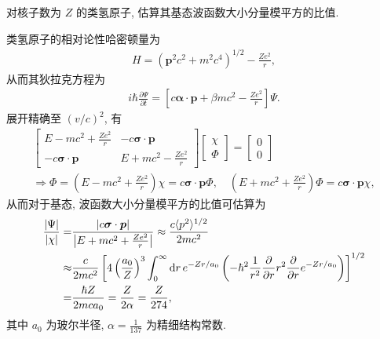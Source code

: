 \documentclass{assignment}
\begin{document}
\begin{prob}
    对核子数为 $Z$ 的类氢原子, 估算其基态波函数大小分量模平方的比值.
\end{prob}
\begin{sol}
    类氢原子的相对论性哈密顿量为
    \begin{align}
        H=(\bm{p}^2c^2+m^2c^4)^{1/2}-\frac{Ze^2}{r},
    \end{align}
    从而其狄拉克方程为
    \begin{align}
        i\hbar\frac{\partial\Psi}{\partial t}=\left[c\bm{\alpha}\cdot\bm{p}+\beta mc^2-\frac{Ze^2}{r}\right]\Psi.
    \end{align}
    展开精确至 $(v/c)^2$, 有
    \begin{gather}
        \begin{bmatrix}
            E-mc^2+\frac{Ze^2}{r}&-c\bm{\sigma}\cdot\bm{p}\\
            -c\bm{\sigma}\cdot\bm{p}&E+mc^2-\frac{Ze^2}{r}
        \end{bmatrix}\begin{bmatrix}
            \chi\\
            \Phi
        \end{bmatrix}=\begin{bmatrix}
            0\\
            0
        \end{bmatrix}\\
        \Longrightarrow\Phi=\left(E-mc^2+\frac{Ze^2}{r}\right)\chi=c\bm{\sigma}\cdot\bm{p}\Phi,\quad\left(E+mc^2+\frac{Ze^2}{r}\right)\Phi=c\bm{\sigma}\cdot\bm{p}\chi,
    \end{gather}
    从而对于基态, 波函数大小分量模平方的比值可估算为
    \begin{align}
        \frac{\left\lvert\Psi\right\rvert}{\left\lvert\chi\right\rvert}=&\frac{\left\lvert c\bm{\sigma}\cdot\bm{p}\right\rvert}{\left\lvert E+mc^2+\frac{Ze^2}{r}\right\rvert}\approx\frac{c\langle p^2\rangle^{1/2}}{2mc^2}\\
        \notag\approx&\frac{c}{2mc^2}\left[4\left(\frac{a_0}{Z}\right)^3\int_0^{\infty}\mathrm{d}r\,e^{-Zr/a_0}\left(-\hbar^2\frac{1}{r^2}\frac{\partial}{\partial r}r^2\frac{\partial}{\partial r}e^{-Zr/a_0}\right)\right]^{1/2}\\
        =&\frac{\hbar Z}{2mca_0}=\frac{Z}{2\alpha}=\frac{Z}{274},
    \end{align}
    其中 $a_0$ 为玻尔半径, $\alpha=\frac{1}{137}$ 为精细结构常数.
\end{sol}
\end{document}
